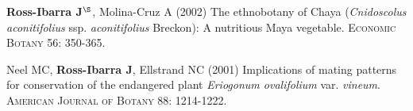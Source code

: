 \begin{etaremune}
\item {\bf Ross-Ibarra J}$^\S$, Molina-Cruz A (2002) The ethnobotany of Chaya (\emph{Cnidoscolus aconitifolius} ssp. \emph{aconitifolius} Breckon): A nutritious Maya vegetable.  \textsc{Economic Botany} 56: 350-365.


\item  Neel MC, {\bf Ross-Ibarra J}, Ellstrand NC (2001) Implications of mating patterns for conservation of the endangered plant \emph{Eriogonum ovalifolium} var. \emph{vineum}.  \textsc{American Journal of Botany} 88: 1214-1222.
\end{etaremune}



